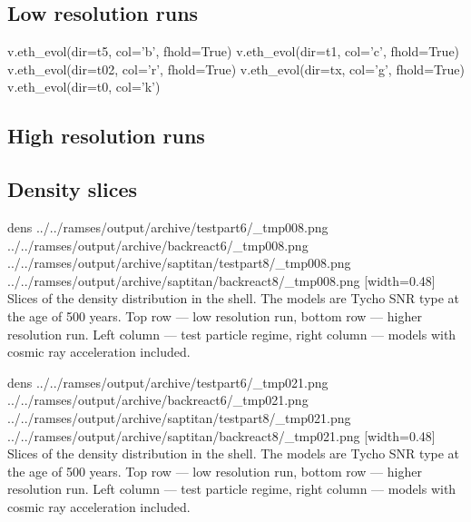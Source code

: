 \documentclass[referee,oldversion]{aa}
\def\basedir{../../ramses/output/archive}
\begin{document}
 \subsection{Low resolution runs}
 
 v.eth_evol(dir=t5, col='b', fhold=True)
 v.eth_evol(dir=t1, col='c', fhold=True)
 v.eth_evol(dir=t02, col='r', fhold=True)
 v.eth_evol(dir=tx, col='g', fhold=True)
 v.eth_evol(dir=t0, col='k')

 
\def\xilo{\basedir/backreact6}
\def\xime{\basedir/weakaccel6}
\def\xihi{\basedir/testpart6}
 


 \subsection{High resolution runs}

% 

\def\xilo{\basedir/saptitan/backreact8}
\def\xime{\basedir/saptitan/weakaccel8}
\def\xihi{\basedir/saptitan/testpart8}
 

\subsection{Density slices}

\FIGfo dens {\basedir/testpart6/_tmp008.png} {\basedir/backreact6/_tmp008.png}  {\basedir/saptitan/testpart8/_tmp008.png} {\basedir/saptitan/backreact8/_tmp008.png} [width=0.48\hsize] Slices of the density distribution in the shell. The models are Tycho SNR type at the age of 500 years. Top row --- low resolution run, bottom row --- higher resolution run. Left column --- test particle regime, right column --- models with cosmic ray acceleration included.

\FIGfo dens \basedir/testpart6/_tmp021.png \basedir/backreact6/_tmp021.png  \basedir/saptitan/testpart8/_tmp021.png \basedir/saptitan/backreact8/_tmp021.png [width=0.48\hsize] Slices of the density distribution in the shell. The models are Tycho SNR type at the age of 500 years. Top row --- low resolution run, bottom row --- higher resolution run. Left column --- test particle regime, right column --- models with cosmic ray acceleration included.
 
\end{document}
